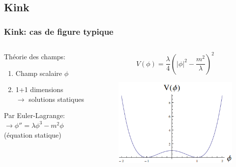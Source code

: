 \documentclass[handout]{beamer}
\begin{document}
\subsection{Kink}
\begin{frame}
\frametitle{Kink: cas de figure typique}
\begin{columns}[T]
    \begin{column}[T]{.5\linewidth}
    Théorie des champs:
    \begin{enumerate}
    \item Champ scalaire $\phi$
    \item 1+1 dimensions\\
    $\rightarrow$ solutions statiques
    \end{enumerate}
    \par
    Par Euler-Lagrange:\\
    $\rightarrow \phi'' = \lambda \phi^3 - m^2 \phi$ (équation statique)
    \end{column}

    \begin{column}[T]{.5\linewidth}
    \begin{equation*}
    V(\phi) = \frac{\lambda}{4}(|\phi|^2 -\frac{m^2}{\lambda})^2
    \end{equation*}
    \begin{figure}
     \includegraphics[scale=0.4]{pot_z2.png}
    \end{figure}
    \end{column}
\end{columns}

\end{frame}
\end{document}
